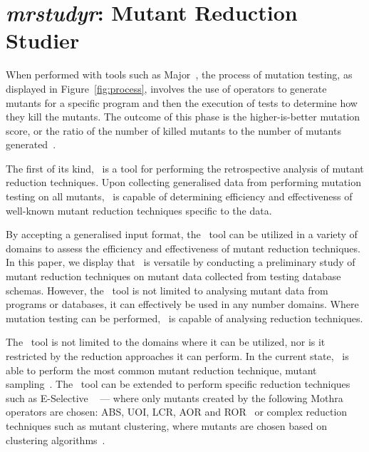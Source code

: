 
\section{\textit{mrstudyr}: Mutant Reduction Studier}





When performed with tools such as Major~\cite{Just2011b}, the process of mutation testing, as displayed in
Figure~\ref{fig:process}, involves the use of operators to generate mutants for a specific program and then the
execution of tests to determine how they kill the mutants. The outcome of this phase is the higher-is-better mutation
score, or the ratio of the number of killed mutants to the number of mutants generated~\cite{Just2011a}.



The first of its kind, \mr~is a tool for performing the retrospective analysis of mutant reduction techniques. Upon
collecting generalised data from performing mutation testing on all mutants, \mr~is capable of determining efficiency
and effectiveness of well-known mutant reduction techniques specific to the data.

By accepting a generalised input format, the \mr~tool can be utilized in a variety of domains to assess the efficiency
and effectiveness of mutant reduction techniques.  In this paper, we display that \mr~is versatile by conducting a
preliminary study of mutant reduction techniques on mutant data collected from testing database schemas.  However, the
\mr~tool is not limited to analysing mutant data from programs or databases, it can effectively be used in any number
domains. Where mutation testing can be performed, \mr~is capable of analysing reduction techniques.




The \mr~tool is not limited to the domains where it can be utilized, nor is it restricted
by the reduction approaches it can perform. In the current state, \mr~is able to perform
the most common mutant reduction technique, mutant sampling~\cite{gopinath2015mutation, jia2011analysis, gopinath2015empirical}.
The \mr~tool can be extended to perform specific reduction techniques such as E-Selective
~\cite{offutt1996experimental} --- where only mutants created by the following Mothra operators
are chosen: ABS, UOI, LCR, AOR and ROR~\cite{gopinath2015empirical} or complex reduction techniques
such as mutant clustering, where mutants are chosen based on clustering algorithms~\cite{jia2011analysis}.

